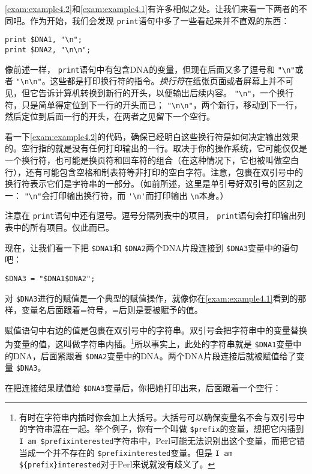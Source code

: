 \autoref{exam:example4.2}和\autoref{exam:example4.1}有许多相似之处。让我们来看一下两者的不同吧。作为开始，我们会发现 \verb|print|语句中多了一些看起来并不直观的东西：

\begin{lstlisting}
print $DNA1, "\n";
print $DNA2, "\n\n";
\end{lstlisting}

像前述一样， \verb|print|语句中有包含DNA的变量，但现在后面又多了逗号和 \verb|"\n"|或者 \verb|"\n\n"|。这些都是打印换行符的指令。\textit{换行符}在纸张页面或者屏幕上并不可见，但它告诉计算机转换到新行的开头，以便输出后续内容。 \verb|"\n"|，一个换行符，只是简单得定位到下一行的开头而已； \verb|"\n\n"|，两个新行，移动到下一行，然后定位到后面一行的开头，在两者之见留下一个空行。

看一下\autoref{exam:example4.2}的代码，确保已经明白这些换行符是如何决定输出效果的。空行指的就是没有任何打印输出的一行。取决于你的操作系统，它可能仅仅是一个换行符，也可能是换页符和回车符的组合（在这种情况下，它也被叫做空白行），还有可能包含空格和制表符等非打印的空白字符。注意，包裹在双引号中的换行符表示它们是字符串的一部分。（如前所述，这里是单引号好双引号的区别之一： \verb|"\n"|会打印输出换行符，而 \verb|'\n'|而打印输出 \verb|\n|本身。）

注意在 \verb|print|语句中还有逗号。逗号分隔列表中的项目， \verb|print|语句会打印输出列表中的所有项目。仅此而已。

现在，让我们看一下把 \verb|$DNA1|和 \verb|$DNA2|两个DNA片段连接到 \verb|$DNA3|变量中的语句吧：

\begin{lstlisting}
$DNA3 = "$DNA1$DNA2"; 
\end{lstlisting}

对 \verb|$DNA3|进行的赋值是一个典型的赋值操作，就像你在\autoref{exam:example4.1}看到的那样，变量名后面跟着=符号，=后则是要被赋予的值。

赋值语句中右边的值是包裹在双引号中的字符串。双引号会把字符串中的变量替换为变量的值，这叫做字符串内插。\footnote{有时在字符串内插时你会加上大括号。大括号可以确保变量名不会与双引号中的字符串混在一起。举个例子，你有一个叫做 \verb|$prefix|的变量，想把它内插到 \verb|I am $prefixinterested|字符串中，Perl可能无法识别出这个变量，而把它错当成一个并不存在的 \verb|$prefixinterested|变量。但是 \verb|I am ${prefix}interested|对于Perl来说就没有歧义了。}所以事实上，此处的字符串就是 \verb|$DNA1|变量中的DNA，后面紧跟着 \verb|$DNA2|变量中的DNA。两个DNA片段连接后就被赋值给了变量 \verb|$DNA3|。

在把连接结果赋值给 \verb|$DNA3|变量后，你把她打印出来，后面跟着一个空行：

